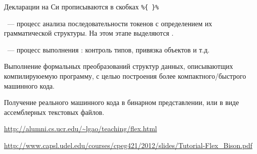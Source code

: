 Декларации на Си прописываются в скобках \verb|%{ }%|



\begin{framed}
\ --- процесс анализа
последовательности токенов с определением их грамматической структуры. На этом
этапе выделяются .
\end{framed}


\begin{framed}
\ --- процесс выполнения
: контроль типов, привязка объектов и т.д. 
\end{framed}


Выполнение формальных преобразований структур данных, описываютщих
компилируюемую программу, с целью построения более компактного/быстрого
машинного кода.


Получение реального машинного кода в бинарном представлении, или в виде
ассемблерных текстовых файлов.

\label{lexlit}

\bigskip

\url{http://alumni.cs.ucr.edu/~lgao/teaching/flex.html}

\url{http://www.capsl.udel.edu/courses/cpeg421/2012/slides/Tutorial-Flex\_Bison.pdf}



\secup
